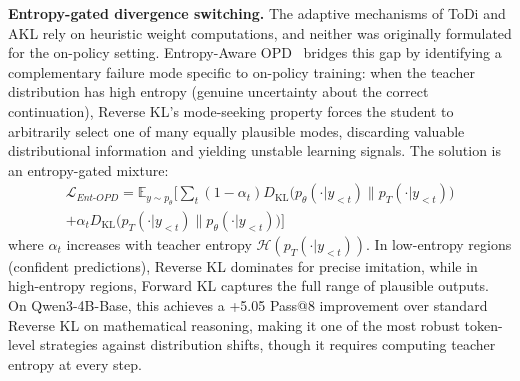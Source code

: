 \documentclass{article} %
\newcommand{\KL}{D_{\mathrm{KL}}}
\newcommand{\ptheta}{p_\theta}
\newcommand{\pteacher}{p_T}
\begin{document}
\textbf{Entropy-gated divergence switching.}
The adaptive mechanisms of ToDi and AKL rely on heuristic weight computations, and neither was originally formulated for the on-policy setting. Entropy-Aware OPD~\citep{2603.07079} bridges this gap by identifying a complementary failure mode specific to on-policy training: when the teacher distribution has high entropy (genuine uncertainty about the correct continuation), Reverse KL's mode-seeking property forces the student to arbitrarily select one of many equally plausible modes, discarding valuable distributional information and yielding unstable learning signals. The solution is an entropy-gated mixture:
\begin{equation}
\begin{split}
    \mathcal{L}_{Ent\text{-}OPD} = \mathbb{E}_{y \sim \ptheta} \bigg[ \sum_t (1 - \alpha_t) \KL\big(\ptheta(\cdot|y_{<t}) \parallel \pteacher(\cdot|y_{<t})\big) \\
    + \alpha_t \KL\big(\pteacher(\cdot|y_{<t}) \parallel \ptheta(\cdot|y_{<t})\big) \bigg]
\end{split}
\end{equation}
where $\alpha_t$ increases with teacher entropy $\mathcal{H}(\pteacher(\cdot|y_{<t}))$. In low-entropy regions (confident predictions), Reverse KL dominates for precise imitation, while in high-entropy regions, Forward KL captures the full range of plausible outputs. On Qwen3-4B-Base, this achieves a +5.05 Pass@8 improvement over standard Reverse KL on mathematical reasoning, making it one of the most robust token-level strategies against distribution shifts, though it requires computing teacher entropy at every step.
\end{document}
